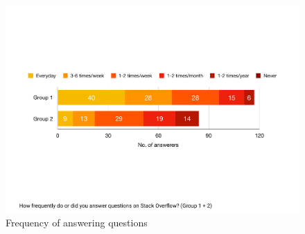\documentclass{svjour3}                     %
\begin{document}

\begin{figure}
		\centering
		\includegraphics[width=0.8\linewidth]{survey_answer_frequency}
		\caption{Frequency of answering questions}
		\label{fig:survey_answer_frequency}
\end{figure}

\end{document}

